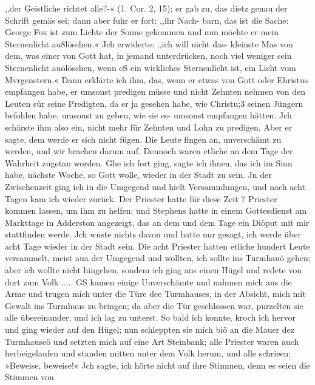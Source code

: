 ,,der Geistliche richtet alle?-« (1. Cor. 2, 15); er gab zu, das dietz
genau der Schrift gemäs sei; dann aber fuhr er fort: ,,ihr Nach-
barn, das ist die Sache: George Fox ist zum Lichte der Sonne
gekommen und nun möchte er mein Sternenlicht au8löschen.« Jch
erwiderte: ,,ich will nicht das- kleinste Mas von dem, was einer
von Gott hat, in jemand unterdrücken, noch viel weniger sein
Sternenlicht auölöschen, wenn eS ein wirkliches Sternenlicht ist,
ein Licht vom Mvrgenstern.« Dann erklärte ich ihm, das, wenn
er etwas von Gott oder Ehristus empfangen habe, er umsonst
predigen müsse und nicht Zehnten nehmen von den Leuten sür
seine Predigten, da er ja gesehen habe, wie Christu;3 seinen
Jüngern befohlen habe, umsonst zu geben, wie sie es- umsonst
empfangen hätten. Jch schärste ihm also ein, nicht mehr für
Zehnten und Lohn zu predigen. Aber er sagte, dem werde er
sich nicht fügen. Die Leute fingen an, unverschämt zu werden,
und wir brachen darum auf. Dennoch waren etliche an dem
Tage der Wahrheit zugetan worden. Ghe ich fort ging, sagte
ich ihnen, das ich im Sinn habe, nächste Woche, so Gott wolle,
wieder in der Stadt zu sein. Jn der Zwischenzeit ging ich in
die Umgegend und hielt Versammlungen, und nach acht Tagen
kam ich wieder zurück. Der Priester hatte für diese Zeit 7 Priester
kommen lassen, um ihm zu helfen; und Stephens hatte in einem
Gottesdienst am Markttage in Adderston angezeigt, das an dem
und dem Tage ein Diöput mit mir stattfinden werde. Jch wuste
nichts davon und hatte nur gesagt, ich werde über acht Tage
wieder in der Stadt sein. Die acht Priester hatten etliche hundert
Leute versammelt, meist aua der Umgegend und wollten, ich sollte
ins Turmhauö gehen; aber ich wollte nicht hingehen, sondem
ich ging aus einen Hügel und redete von dort zum Volk .....
GS kamen einige Unverschämte und nahmen mich aus die
Arme und trugen mich unter die Türe dee Turmhauses, in der
Absicht, mich mit Gewalt ins Turmhaus zu bringen; da aber
die Tür geschlossen war, purzelten sie alle übereinander; und ich
lag zu unterst. So bald ich konnte, kroch ich hervor und ging wieder
auf den Hügel; nun schleppten sie mich biö an die Mauer
dez Turmhauseö und setzten mich auf eine Art Steinbank; alle
Priester waren auch herbeigelaufen und standen mitten unter dem
Volk herum, und alle schrieen: »Beweise, beweise!« Jch sagte,
ich hörte nicht auf ihre Stimmen, denn es seien die Stimmen von


